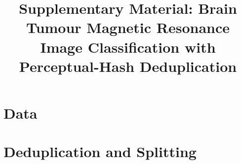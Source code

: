 \documentclass[a4paper,fleqn]{cas-sc}
\begin{document}

\ifdefined\Anonymised{}\else{}\fi

\title[mode=title]{Supplementary Material: Brain Tumour Magnetic Resonance Image Classification with Perceptual-Hash Deduplication}

\maketitle

\section{Data}
\label{sec:supp-data}

\begin{herefigure}
\centering
{}
\medskip
{}
\caption{Sample images of each class, the brain crop that every model is trained and evaluated on, and the head masks used by the attention and shortcut analyses. The MRI sequence is unknown in both pools: neither binary detection source records it, and in the subtype classification pool only the Cheng component is known to be contrast-enhanced T1-weighted, so each pool is a mixture of unknown composition and a model trained on it cannot be specified for a particular acquisition protocol.}
\label{fig:samples}
\end{herefigure}

\section{Deduplication and Splitting}
\label{sec:supp-curation}
\end{document}
